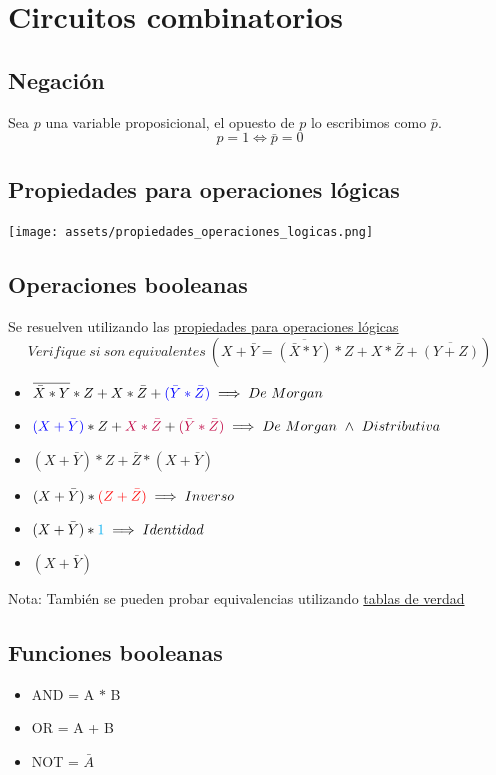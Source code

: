 \documentclass[10pt,a4paper]{article}
\begin{document}
\section{Circuitos combinatorios}
\subsection*{Negación}
Sea \(p\) una variable proposicional, el opuesto de \(p\) lo escribimos como \(\bar{p}\).
\[ p = 1 \iff \bar{p} = 0 \]

\subsection*{Propiedades para operaciones lógicas} 
\label{subsec:PPOL}
\begin{minipage}[b]{0.6\textwidth}
    \texttt{[image: assets/propiedades\_operaciones\_logicas.png]}
    \label{fig:propiedades_operaciones_logicas}
\end{minipage}
\subsection*{Operaciones booleanas}
Se resuelven utilizando las \hyperref[subsec:PPOL]{propiedades para operaciones lógicas}
\[Verifique \ si \ son \ equivalentes \ (X + \bar{Y} = \overline{(\bar{X} \ast Y)} \ast Z + X \ast \bar{Z} + \overline{(Y+Z)})\]
\begin{itemize}
    \item  \(\overline{\bar{X} \ast Y} \ast Z + X \ast \bar{Z} + \textcolor{blue}{(\bar{Y} \ast \bar{Z})} \implies De \ Morgan\) 
    \item  \(\textcolor{blue}{(X + \bar{Y})} \ast Z + \textcolor{purple}{X \ast \bar{Z}} + \textcolor{purple}{(\bar{Y} \ast \bar{Z})}\implies De \ Morgan \ \land \ Distributiva \) 
    \item  \((X + \bar{Y}) \ast Z + \bar{Z} \ast (X + \bar{Y})\)
    \item  \((X + \bar{Y}) \ast \textcolor{red}{(Z + \bar{Z})} \implies Inverso\) 
    \item  \((X + \bar{Y}) \ast \textcolor{cyan}{1} \implies Identidad \) 
    \item  \((X + \bar{Y})\)
\end{itemize}
Nota: También se pueden probar equivalencias utilizando \hyperref[subsec:TDV]{tablas de verdad}
\subsection*{Funciones booleanas}
\begin{itemize}
    \item AND = A \(\ast \) B
    \item OR = A + B
    \item NOT = \(\bar{A}\)
    \end{itemize} 
\end{document}
